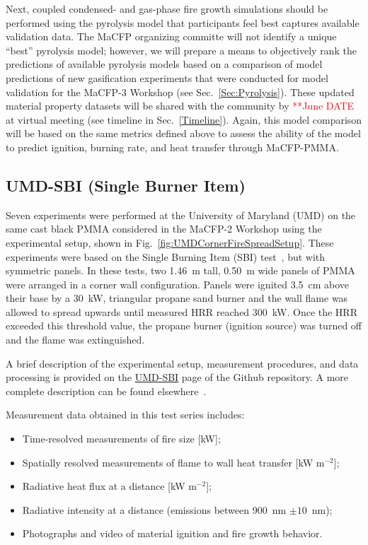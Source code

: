 \documentclass[12pt]{article}
\begin{document}
Next, coupled condensed- and gas-phase fire growth simulations should be performed using the pyrolysis model that participants feel best captures available validation data. The MaCFP organizing committe will not identify a unique ``best'' pyrolysis model; however, we will prepare a means to objectively rank the predictions of available pyrolysis models based on a comparison of model predictions of new gasification experiments that were conducted for model validation for the MaCFP-3 Workshop (see Sec.~\ref{Sec:Pyrolysis}). These updated material property datasets will be shared with the community by \textcolor{red}{**June DATE} at virtual meeting (see timeline in Sec.~\ref{Timeline}). Again, this model comparison will be based on the same metrics defined above to assess the ability of the model to predict ignition, burning rate, and heat transfer through MaCFP-PMMA. 

\subsection {UMD-SBI (Single Burner Item)}
Seven experiments were performed at the University of Maryland (UMD) on the same cast black PMMA considered in the MaCFP-2 Workshop using the experimental setup, shown in Fig.~\ref{fig:UMDCornerFireSpreadSetup}. These experiments were based on the Single Burning Item (SBI) test~\cite{EN-13823standard}, but with symmetric panels. In these tests, two 1.46~m tall, 0.50~m wide panels of PMMA were arranged in a corner wall configuration. Panels were ignited 3.5~cm above their base by a 30~kW, triangular propane sand burner and the wall flame was allowed to spread upwards until measured HRR reached 300~kW. Once the HRR exceeded this threshold value, the propane burner (ignition source) was turned off and the flame was extinguished.

A brief description of the experimental setup, measurement procedures, and data processing is provided on the \href{https://github.com/MaCFP/macfp-db/tree/master/Fire_Growth/UMD_SBI}{UMD-SBI} page of the Github repository. A more complete description can be found elsewhere~\cite{chaudhari2021experimental}.

Measurement data obtained in this test series includes:
\begin{itemize}[noitemsep]
\item Time-resolved measurements of fire size [kW];
\item Spatially resolved measurements of flame to wall heat transfer [kW m$^{-2}$];
\item Radiative heat flux at a distance [kW m$^{-2}$]; 
\item Radiative intensity at a distance (emissions between 900~nm $\pm10$~nm); 
\item Photographs and video of material ignition and fire growth behavior.
\end{itemize}
\end{document}
